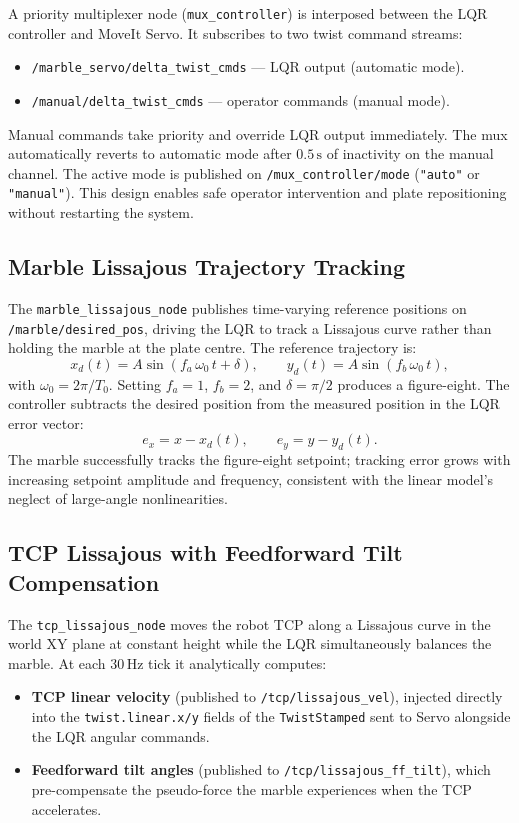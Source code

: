 \documentclass[journal]{IEEEtran}
\begin{document}
A priority multiplexer node (\texttt{mux\_controller}) is interposed between the LQR controller and
MoveIt Servo. It subscribes to two twist command streams:
\begin{itemize}
  \item \texttt{/marble\_servo/delta\_twist\_cmds} — LQR output (automatic mode).
  \item \texttt{/manual/delta\_twist\_cmds} — operator commands (manual mode).
\end{itemize}
Manual commands take priority and override LQR output immediately. The mux automatically reverts to
automatic mode after $0.5\,\mathrm{s}$ of inactivity on the manual channel. The active mode is published
on \texttt{/mux\_controller/mode} (\texttt{"auto"} or \texttt{"manual"}). This design enables safe
operator intervention and plate repositioning without restarting the system.

\subsection{Marble Lissajous Trajectory Tracking}

The \texttt{marble\_lissajous\_node} publishes time-varying reference positions on
\texttt{/marble/desired\_pos}, driving the LQR to track a Lissajous curve rather than holding the marble
at the plate centre. The reference trajectory is:
%
\begin{equation}
  x_d(t) = A\sin(f_a\,\omega_0\,t + \delta), \qquad
  y_d(t) = A\sin(f_b\,\omega_0\,t),
  \label{eq:lissajous_marble}
\end{equation}
%
with $\omega_0 = 2\pi/T_0$. Setting $f_a = 1$, $f_b = 2$, and $\delta = \pi/2$ produces a figure-eight.
The controller subtracts the desired position from the measured position in the LQR error vector:
%
\begin{equation}
  e_x = x - x_d(t), \qquad e_y = y - y_d(t).
\end{equation}
%
The marble successfully tracks the figure-eight setpoint; tracking error grows with increasing setpoint
amplitude and frequency, consistent with the linear model's neglect of large-angle nonlinearities.

\subsection{TCP Lissajous with Feedforward Tilt Compensation}

The \texttt{tcp\_lissajous\_node} moves the robot TCP along a Lissajous curve in the world XY plane at
constant height while the LQR simultaneously balances the marble. At each 30\,Hz tick it analytically
computes:
\begin{itemize}
  \item \textbf{TCP linear velocity} (published to \texttt{/tcp/lissajous\_vel}), injected directly into
    the \texttt{twist.linear.x/y} fields of the \texttt{TwistStamped} sent to Servo alongside the LQR
    angular commands.
  \item \textbf{Feedforward tilt angles} (published to \texttt{/tcp/lissajous\_ff\_tilt}), which
    pre-compensate the pseudo-force the marble experiences when the TCP accelerates.
\end{itemize}
\end{document}
